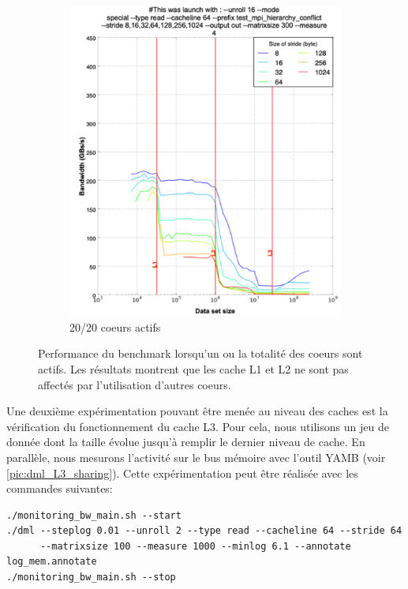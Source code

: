 \begin{figure}
            \begin{subfigure}[b]{0.47\linewidth}
            \includegraphics[width=\linewidth]{images/dml_cache_20core.png}
            \caption{20/20 coeurs actifs}
            \label{pic:dml_cache_20core}
            \end{subfigure}
        \caption{Performance du benchmark lorsqu'un ou la totalité des coeurs sont actifs. Les résultats montrent que les cache L1 et L2 ne sont pas affectés par l'utilisation d'autres coeurs.}\label{pic:dml_cache}
        \end{figure}
        
        Une deuxième expérimentation pouvant être menée au niveau des caches est la vérification du fonctionnement du cache L3. Pour cela, nous utilisons un jeu de donnée dont la taille évolue jusqu'à remplir le dernier niveau de cache.  En parallèle, nous mesurons l'activité sur le bus mémoire avec l'outil YAMB (voir \autoref{pic:dml_L3_sharing}). Cette expérimentation peut être réalisée avec les commandes suivantes:
        \begin{verbatim}
./monitoring_bw_main.sh --start
./dml --steplog 0.01 --unroll 2 --type read --cacheline 64 --stride 64  
      --matrixsize 100 --measure 1000 --minlog 6.1 --annotate log_mem.annotate
./monitoring_bw_main.sh --stop
        \end{verbatim}
        
